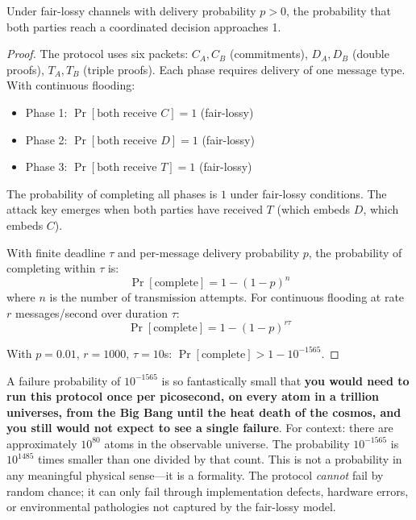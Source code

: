 \begin{theorem}[Liveness]
\label{thm:liveness}
Under fair-lossy channels with delivery probability $p > 0$, the probability that both parties reach a coordinated decision approaches 1.
\end{theorem}

\begin{proof}
The protocol uses six packets: $C_A, C_B$ (commitments), $D_A, D_B$ (double proofs), $T_A, T_B$ (triple proofs). Each phase requires delivery of one message type. With continuous flooding:
\begin{itemize}
    \item Phase 1: $\Pr[\text{both receive } C] = 1$ (fair-lossy)
    \item Phase 2: $\Pr[\text{both receive } D] = 1$ (fair-lossy)
    \item Phase 3: $\Pr[\text{both receive } T] = 1$ (fair-lossy)
\end{itemize}

The probability of completing all phases is $1$ under fair-lossy conditions. The attack key emerges when both parties have received $T$ (which embeds $D$, which embeds $C$).

With finite deadline $\tau$ and per-message delivery probability $p$, the probability of completing within $\tau$ is:
\[
\Pr[\text{complete}] = 1 - (1-p)^{n}
\]
where $n$ is the number of transmission attempts. For continuous flooding at rate $r$ messages/second over duration $\tau$:
\[
\Pr[\text{complete}] = 1 - (1-p)^{r\tau}
\]

With $p = 0.01$, $r = 1000$, $\tau = 10$s: $\Pr[\text{complete}] > 1 - 10^{-1565}$.
\end{proof}

\begin{remark}
\label{rmk:physical}
A failure probability of $10^{-1565}$ is so fantastically small that \textbf{you would need to run this protocol once per picosecond, on every atom in a trillion universes, from the Big Bang until the heat death of the cosmos, and you still would not expect to see a single failure}. For context: there are approximately $10^{80}$ atoms in the observable universe. The probability $10^{-1565}$ is $10^{1485}$ times smaller than one divided by that count. This is not a probability in any meaningful physical sense---it is a formality. The protocol \emph{cannot} fail by random chance; it can only fail through implementation defects, hardware errors, or environmental pathologies not captured by the fair-lossy model.
\end{remark}

